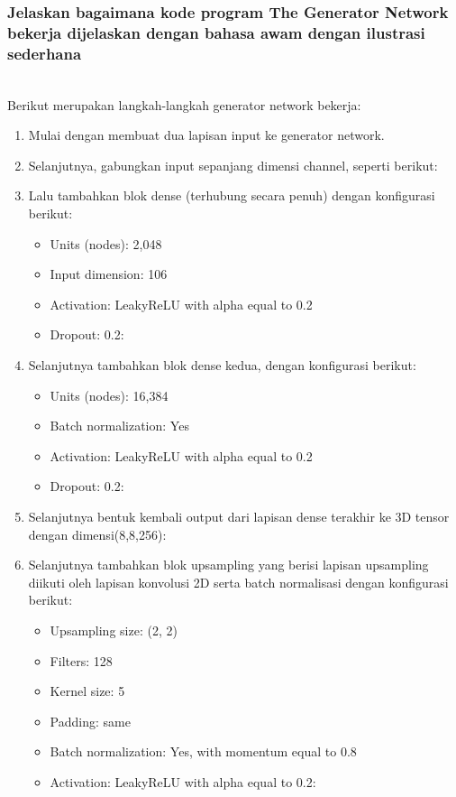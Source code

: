 \subsubsection{Jelaskan bagaimana kode program The Generator Network bekerja dijelaskan dengan bahasa awam dengan ilustrasi sederhana}
\hfill\\
Berikut merupakan langkah-langkah generator network bekerja:
\begin{enumerate}
\item Mulai dengan membuat dua lapisan input ke generator network.


\item Selanjutnya, gabungkan input sepanjang dimensi channel, seperti berikut:
	

\item Lalu tambahkan blok dense (terhubung secara penuh) dengan konfigurasi berikut:
	\begin{itemize}
		\item Units (nodes): 2,048
		\item Input dimension: 106
		\item Activation: LeakyReLU with alpha equal to 0.2
		\item Dropout: 0.2:
	\end{itemize}
	

\item Selanjutnya tambahkan blok dense kedua, dengan konfigurasi berikut:
	\begin{itemize}
		\item Units (nodes): 16,384
		\item Batch normalization: Yes
		\item Activation: LeakyReLU with alpha equal to 0.2
		\item Dropout: 0.2:	
	\end{itemize}
	

\item Selanjutnya bentuk kembali output dari lapisan dense terakhir ke 3D tensor dengan dimensi(8,8,256):
	

\item Selanjutnya tambahkan blok upsampling yang berisi lapisan upsampling diikuti oleh lapisan konvolusi 2D serta batch normalisasi dengan konfigurasi berikut:
	\begin{itemize}
		\item Upsampling size: (2, 2)
		\item Filters: 128
		\item Kernel size: 5
		\item Padding: same
		\item Batch normalization: Yes, with momentum equal to 0.8
		\item Activation: LeakyReLU with alpha equal to 0.2:
	\end{itemize}
	


\end{enumerate}
